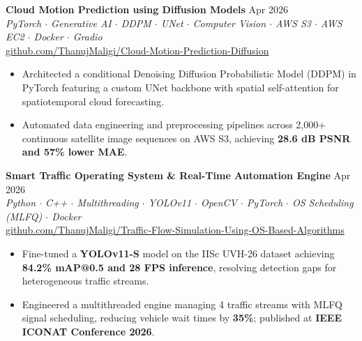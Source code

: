 \documentclass[a4paper,10pt]{article}
\begin{document}
\vspace{1pt}

\textbf{Cloud Motion Prediction using Diffusion Models} \hfill Apr 2026\\
\textit{PyTorch $\cdot$ Generative AI $\cdot$ DDPM $\cdot$ UNet $\cdot$ Computer Vision $\cdot$ AWS S3 $\cdot$ AWS EC2 $\cdot$ Docker $\cdot$ Gradio}\\
\href{https://github.com/ThanujMaligi/Cloud-Motion-Prediction-Diffusion}{github.com/ThanujMaligi/Cloud-Motion-Prediction-Diffusion}
\begin{itemize}[leftmargin=*,noitemsep,topsep=1pt,parsep=0pt,partopsep=0pt,itemsep=1pt]
\item Architected a conditional Denoising Diffusion Probabilistic Model (DDPM) in PyTorch featuring a custom UNet backbone with spatial self-attention for spatiotemporal cloud forecasting.
\item Automated data engineering and preprocessing pipelines across 2,000+ continuous satellite image sequences on AWS S3, achieving \textbf{28.6 dB PSNR and 57\% lower MAE}.
\end{itemize}

\vspace{1pt}

\textbf{Smart Traffic Operating System \& Real-Time Automation Engine} \hfill Apr 2026\\
\textit{Python $\cdot$ C++ $\cdot$ Multithreading $\cdot$ YOLOv11 $\cdot$ OpenCV $\cdot$ PyTorch $\cdot$ OS Scheduling (MLFQ) $\cdot$ Docker}\\
\href{https://github.com/ThanujMaligi/Traffic-Flow-Simulation-Using-OS-Based-Algorithms-}{github.com/ThanujMaligi/Traffic-Flow-Simulation-Using-OS-Based-Algorithms}
\begin{itemize}[leftmargin=*,noitemsep,topsep=1pt,parsep=0pt,partopsep=0pt,itemsep=1pt]
\item Fine-tuned a \textbf{YOLOv11-S} model on the IISc UVH-26 dataset achieving \textbf{84.2\% mAP@0.5 and 28 FPS inference}, resolving detection gaps for heterogeneous traffic streams.
\item Engineered a multithreaded engine managing 4 traffic streams with MLFQ signal scheduling, reducing vehicle wait times by \textbf{35\%}; published at \textbf{IEEE ICONAT Conference 2026}.
\end{itemize}

\vspace{1pt}

\end{document}
